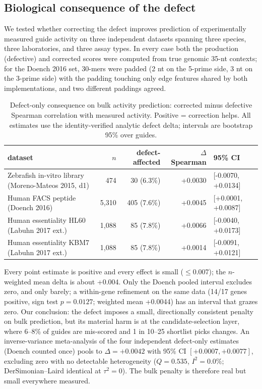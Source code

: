 \subsection{Biological consequence of the defect}
We tested whether correcting the defect improves prediction of experimentally measured guide activity on three independent datasets spanning three species, three laboratories, and three assay types. In every case both the production (defective) and corrected scores were computed from true genomic 35-nt contexts; for the Doench 2016 set, 30-mers were padded (2 nt on the 5-prime side, 3 nt on the 3-prime side) with the padding touching only edge features shared by both implementations, and two different paddings agreed.
\begin{table}[h]\centering\small\begin{tabular}{lrrrl}\hline dataset & $n$ & defect-affected & $\Delta$ Spearman & 95\% CI\\\hline
Zebrafish in-vitro library (Moreno-Mateos 2015, d1) & 474 & 30 (6.3\%) & +0.0030 & [-0.0070, +0.0134]\\
Human FACS peptide (Doench 2016) & 5,310 & 405 (7.6\%) & +0.0045 & [+0.0001, +0.0087]\\
Human essentiality HL60 (Labuhn 2017 ext.) & 1,088 & 85 (7.8\%) & +0.0066 & [-0.0040, +0.0173]\\
Human essentiality KBM7 (Labuhn 2017 ext.) & 1,088 & 85 (7.8\%) & +0.0014 & [-0.0091, +0.0121]\\
\hline\end{tabular}\caption{Defect-only consequence on bulk activity prediction: corrected minus defective Spearman correlation with measured activity. Positive = correction helps. All estimates use the identity-verified analytic defect delta; intervals are bootstrap 95\% over guides.}\end{table}
Every point estimate is positive and every effect is small ($\leq$0.007); the $n$-weighted mean delta is about +0.004. Only the Doench pooled interval excludes zero, and only barely; a within-gene refinement on the same data (14/17 genes positive, sign test $p=0.0127$; weighted mean +0.0044) has an interval that grazes zero. Our conclusion: the defect imposes a small, directionally consistent penalty on bulk prediction, but its material harm is at the candidate-selection layer, where 6--8\% of guides are mis-scored and 1 in 10--25 shortlist picks changes. An inverse-variance meta-analysis of the four independent defect-only estimates (Doench counted once) pools to $\Delta = +0.0042$ with 95\% CI $[+0.0007, +0.0077]$, excluding zero with no detectable heterogeneity ($Q=0.535$, $I^2=0.0\%$; DerSimonian--Laird identical at $\tau^2=0$). The bulk penalty is therefore real but small everywhere measured.

